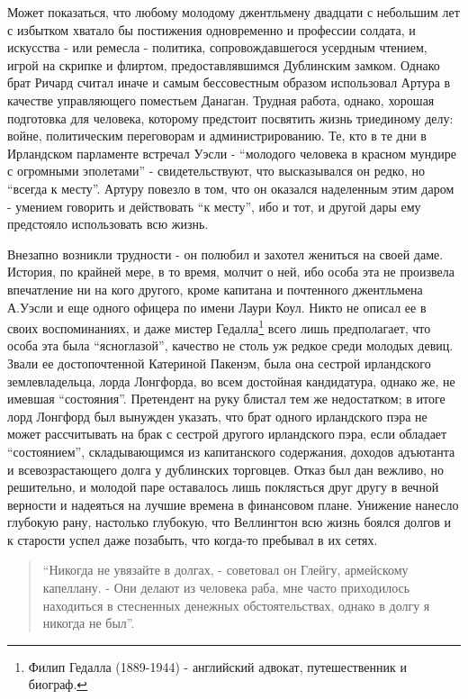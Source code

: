 \documentclass[
  oneside,
  12pt,
  titlepage]{book}
\begin{document}
Может показаться, что любому молодому джентльмену двадцати с небольшим лет с избытком хватало бы постижения одновременно и профессии солдата, и искусства - или ремесла - политика, сопровождавшегося усердным чтением, игрой на скрипке и флиртом, предоставлявшимся Дублинским замком. Однако брат Ричард считал иначе и самым бессовестным образом использовал Артура в качестве управляющего поместьем Данаган. Трудная работа, однако, хорошая подготовка для человека, которому предстоит посвятить жизнь триединому делу: войне, политическим переговорам и администрированию. Те, кто в те дни в Ирландском парламенте встречал Уэсли - ``молодого человека в красном мундире с огромными эполетами'' - свидетельствуют, что высказывался он редко, но ``всегда к месту''. Артуру повезло в том, что он оказался наделенным этим даром - умением говорить и действовать ``к месту'', ибо и тот, и другой дары ему предстояло использовать всю жизнь.

Внезапно возникли трудности - он полюбил и захотел жениться на своей даме. История, по крайней мере, в то время, молчит о ней, ибо особа эта не произвела впечатление ни на кого другого, кроме капитана и почтенного джентльмена А.Уэсли и еще одного офицера по имени Лаури Коул. Никто не описал ее в своих воспоминаниях, и даже мистер Гедалла\footnote{Филип Гедалла (1889-1944) - английский адвокат, путешественник и биограф.} всего лишь предполагает, что особа эта была ``ясноглазой'', качество не столь уж редкое среди молодых девиц. Звали ее достопочтенной Катериной Пакенэм, была она сестрой ирландского землевладельца, лорда Лонгфорда, во всем достойная кандидатура, однако же, не имевшая ``состояния''. Претендент на руку блистал тем же недостатком; в итоге лорд Лонгфорд был вынужден указать, что брат одного ирландского пэра не может рассчитывать на брак с сестрой другого ирландского пэра, если обладает ``состоянием'', складывающимся из капитанского содержания, доходов адъютанта и всевозрастающего долга у дублинских торговцев. Отказ был дан вежливо, но решительно, и молодой паре оставалось лишь поклясться друг другу в вечной верности и надеяться на лучшие времена в финансовом плане. Унижение нанесло глубокую рану, настолько глубокую, что Веллингтон всю жизнь боялся долгов и к старости успел даже позабыть, что когда-то пребывал в их сетях.

\begin{quote}
``Никогда не увязайте в долгах, - советовал он Глейгу, армейскому капеллану. - Они делают из человека раба, мне часто приходилось находиться в стесненных денежных обстоятельствах, однако в долгу я никогда не был''.
\end{quote}
\end{document}
